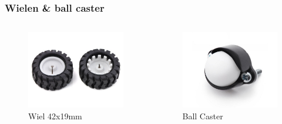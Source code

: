 \documentclass[aspectratio=169,kulak,t]{kulakbeamer} %
\begin{document}
\begin{frame}
	\frametitle{Wielen \& ball caster}
	\begin{columns}
		\begin{figure}
			\centering
			\includegraphics[width=.7\textwidth]{wielen}
			\caption{Wiel 42x19mm}
		\end{figure}
		\begin{figure}
			\centering
			\includegraphics[width=.7\textwidth]{ballcaster}
			\caption{Ball Caster}
		\end{figure}
	\end{columns}
	
\end{frame}
\end{document}
